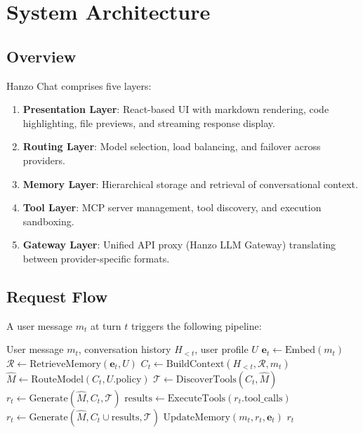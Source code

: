\section{System Architecture}

\label{sec:architecture}

\subsection{Overview}

Hanzo Chat comprises five layers:

\begin{enumerate}[leftmargin=1.4em]
    \item \textbf{Presentation Layer}: React-based UI with markdown rendering, code highlighting, file previews, and streaming response display.
    \item \textbf{Routing Layer}: Model selection, load balancing, and failover across providers.
    \item \textbf{Memory Layer}: Hierarchical storage and retrieval of conversational context.
    \item \textbf{Tool Layer}: MCP server management, tool discovery, and execution sandboxing.
    \item \textbf{Gateway Layer}: Unified API proxy (Hanzo LLM Gateway) translating between provider-specific formats.
\end{enumerate}

\subsection{Request Flow}

A user message $m_t$ at turn $t$ triggers the following pipeline:

\begin{algorithm}[H]
\caption{Hanzo Chat Request Pipeline}
\label{alg:pipeline}
\begin{algorithmic}[1]
\Require User message $m_t$, conversation history $H_{<t}$, user profile $U$
\State $\bm{e}_t \gets \text{Embed}(m_t)$ 
\State $\mathcal{R} \gets \text{RetrieveMemory}(\bm{e}_t, U)$ 
\State $C_t \gets \text{BuildContext}(H_{<t}, \mathcal{R}, m_t)$ 
\State $\hat{M} \gets \text{RouteModel}(C_t, U.\text{policy})$ 
\State $\mathcal{T} \gets \text{DiscoverTools}(C_t, \hat{M})$ 
\State $r_t \gets \text{Generate}(\hat{M}, C_t, \mathcal{T})$ 
    \State $\text{results} \gets \text{ExecuteTools}(r_t.\text{tool\_calls})$
    \State $r_t \gets \text{Generate}(\hat{M}, C_t \cup \text{results}, \mathcal{T})$
\EndWhile
\State $\text{UpdateMemory}(m_t, r_t, \bm{e}_t)$
\State \Return $r_t$
\end{algorithmic}
\end{algorithm}

